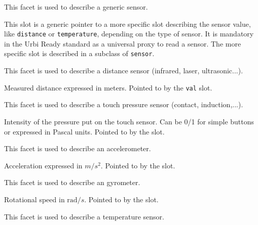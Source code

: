 
This facet is used to describe a generic sensor.

\begin{slots}
  {%
    This slot is a generic pointer to a more specific slot describing
    the sensor value, like \texttt{distance} or \texttt{temperature},
    depending on the type of sensor. It is mandatory in the Urbi Ready
    standard as a universal proxy to read a sensor. The more specific
    slot is described in a subclass of \texttt{sensor}.%
  }

\end{slots}



This facet is used to describe a distance sensor (infrared, laser,
ultrasonic...).

\begin{slots}
  {%
    Measured distance expressed in meters.  Pointed to by the
    \texttt{val} slot.%
  }

\end{slots}



This facet is used to describe a touch pressure sensor (contact,
induction,...).

\begin{slots}
  {%
    Intensity of the pressure put on the touch sensor. Can be 0/1 for
    simple buttons or expressed in Pascal units. Pointed to by the
     slot.%
  }

\end{slots}



This facet is used to describe an accelerometer.

\begin{slots}
  {%
    Acceleration expressed in $m/s^2$.  Pointed to by the 
    slot.%
  }

\end{slots}

This facet is used to describe an gyrometer.

\begin{slots}
  {%
    Rotational speed in $\mathrm{rad}/s$.  Pointed to by the
     slot.%
  }
\end{slots}

This facet is used to describe a temperature sensor.

